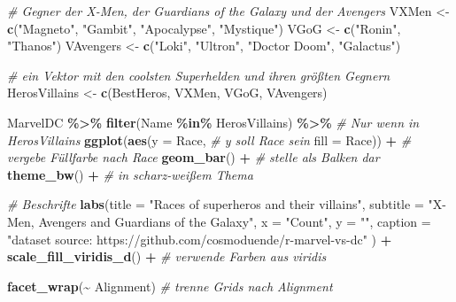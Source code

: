 \documentclass[
  ngerman,
]{book}
\newenvironment{Shaded}{\begin{snugshade}}{\end{snugshade}}
\newcommand{\AttributeTok}[1]{\textcolor[rgb]{0.13,0.29,0.53}{#1}}
\newcommand{\CommentTok}[1]{\textcolor[rgb]{0.56,0.35,0.01}{\textit{#1}}}
\newcommand{\FunctionTok}[1]{\textcolor[rgb]{0.13,0.29,0.53}{\textbf{#1}}}
\newcommand{\NormalTok}[1]{#1}
\newcommand{\OtherTok}[1]{\textcolor[rgb]{0.56,0.35,0.01}{#1}}
\newcommand{\SpecialCharTok}[1]{\textcolor[rgb]{0.81,0.36,0.00}{\textbf{#1}}}
\newcommand{\StringTok}[1]{\textcolor[rgb]{0.31,0.60,0.02}{#1}}
\begin{document}
\begin{Shaded}
\begin{Highlighting}[]
\CommentTok{\# Gegner der X{-}Men, der Guardians of the Galaxy und der Avengers}
\NormalTok{VXMen }\OtherTok{\textless{}{-}} \FunctionTok{c}\NormalTok{(}\StringTok{"Magneto"}\NormalTok{, }\StringTok{"Gambit"}\NormalTok{, }\StringTok{"Apocalypse"}\NormalTok{, }\StringTok{"Mystique"}\NormalTok{)}
\NormalTok{VGoG }\OtherTok{\textless{}{-}} \FunctionTok{c}\NormalTok{(}\StringTok{"Ronin"}\NormalTok{, }\StringTok{"Thanos"}\NormalTok{)}
\NormalTok{VAvengers }\OtherTok{\textless{}{-}} \FunctionTok{c}\NormalTok{(}\StringTok{"Loki"}\NormalTok{, }\StringTok{"Ultron"}\NormalTok{, }\StringTok{"Doctor Doom"}\NormalTok{, }\StringTok{"Galactus"}\NormalTok{)}

\CommentTok{\# ein Vektor mit den coolsten Superhelden und ihren größten Gegnern}
\NormalTok{HerosVillains }\OtherTok{\textless{}{-}} \FunctionTok{c}\NormalTok{(BestHeros, VXMen, VGoG, VAvengers)}

\NormalTok{MarvelDC }\SpecialCharTok{\%\textgreater{}\%}
  \FunctionTok{filter}\NormalTok{(Name }\SpecialCharTok{\%in\%}\NormalTok{ HerosVillains) }\SpecialCharTok{\%\textgreater{}\%}  \CommentTok{\# Nur wenn in \textquotesingle{}HerosVillains\textquotesingle{}}
  \FunctionTok{ggplot}\NormalTok{(}\FunctionTok{aes}\NormalTok{(}\AttributeTok{y =}\NormalTok{ Race,                 }\CommentTok{\# y soll \textquotesingle{}Race\textquotesingle{} sein}
             \AttributeTok{fill =}\NormalTok{ Race)) }\SpecialCharTok{+}           \CommentTok{\# vergebe Füllfarbe nach \textquotesingle{}Race\textquotesingle{}}
  \FunctionTok{geom\_bar}\NormalTok{() }\SpecialCharTok{+}                         \CommentTok{\# stelle als Balken dar}
  \FunctionTok{theme\_bw}\NormalTok{() }\SpecialCharTok{+}                         \CommentTok{\# in scharz{-}weißem Thema}
  
  \CommentTok{\# Beschrifte}
  \FunctionTok{labs}\NormalTok{(}\AttributeTok{title =} \StringTok{"Races of superheros and their villains"}\NormalTok{,}
       \AttributeTok{subtitle =} \StringTok{"X{-}Men, Avengers and Guardians of the Galaxy"}\NormalTok{,}
         \AttributeTok{x =} \StringTok{"Count"}\NormalTok{, }
         \AttributeTok{y =} \StringTok{""}\NormalTok{,}
         \AttributeTok{caption =} \StringTok{"dataset source: https://github.com/cosmoduende/r{-}marvel{-}vs{-}dc"}\NormalTok{ ) }\SpecialCharTok{+}
  \FunctionTok{scale\_fill\_viridis\_d}\NormalTok{() }\SpecialCharTok{+}             \CommentTok{\# verwende Farben aus viridis}
  
  \FunctionTok{facet\_wrap}\NormalTok{(}\SpecialCharTok{\textasciitilde{}}\NormalTok{ Alignment)              }\CommentTok{\# trenne Grids nach \textquotesingle{}Alignment\textquotesingle{}}
\end{Highlighting}
\end{Shaded}
\end{document}
